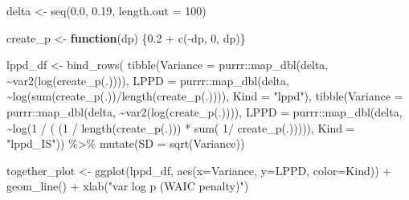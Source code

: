 \documentclass[
]{book}
\newenvironment{Shaded}{\begin{snugshade}}{\end{snugshade}}
\newcommand{\AttributeTok}[1]{\textcolor[rgb]{0.77,0.63,0.00}{#1}}
\newcommand{\ControlFlowTok}[1]{\textcolor[rgb]{0.13,0.29,0.53}{\textbf{#1}}}
\newcommand{\DecValTok}[1]{\textcolor[rgb]{0.00,0.00,0.81}{#1}}
\newcommand{\FloatTok}[1]{\textcolor[rgb]{0.00,0.00,0.81}{#1}}
\newcommand{\FunctionTok}[1]{\textcolor[rgb]{0.00,0.00,0.00}{#1}}
\newcommand{\NormalTok}[1]{#1}
\newcommand{\OtherTok}[1]{\textcolor[rgb]{0.56,0.35,0.01}{#1}}
\newcommand{\SpecialCharTok}[1]{\textcolor[rgb]{0.00,0.00,0.00}{#1}}
\newcommand{\StringTok}[1]{\textcolor[rgb]{0.31,0.60,0.02}{#1}}
\begin{document}
\begin{Shaded}
\begin{Highlighting}[]
\NormalTok{delta }\OtherTok{\textless{}{-}} \FunctionTok{seq}\NormalTok{(}\FloatTok{0.0}\NormalTok{, }\FloatTok{0.19}\NormalTok{, }\AttributeTok{length.out =} \DecValTok{100}\NormalTok{)}

\NormalTok{create\_p }\OtherTok{\textless{}{-}} \ControlFlowTok{function}\NormalTok{(dp) \{}\FloatTok{0.2} \SpecialCharTok{+} \FunctionTok{c}\NormalTok{(}\SpecialCharTok{{-}}\NormalTok{dp, }\DecValTok{0}\NormalTok{, dp)\}}

\NormalTok{lppd\_df }\OtherTok{\textless{}{-}} \FunctionTok{bind\_rows}\NormalTok{(}
  \FunctionTok{tibble}\NormalTok{(}\AttributeTok{Variance =}\NormalTok{ purrr}\SpecialCharTok{::}\FunctionTok{map\_dbl}\NormalTok{(delta, }\SpecialCharTok{\textasciitilde{}}\FunctionTok{var2}\NormalTok{(}\FunctionTok{log}\NormalTok{(}\FunctionTok{create\_p}\NormalTok{(.)))),}
         \AttributeTok{LPPD =}\NormalTok{ purrr}\SpecialCharTok{::}\FunctionTok{map\_dbl}\NormalTok{(delta, }\SpecialCharTok{\textasciitilde{}}\FunctionTok{log}\NormalTok{(}\FunctionTok{sum}\NormalTok{(}\FunctionTok{create\_p}\NormalTok{(.))}\SpecialCharTok{/}\FunctionTok{length}\NormalTok{(}\FunctionTok{create\_p}\NormalTok{(.)))),}
         \AttributeTok{Kind =} \StringTok{"lppd"}\NormalTok{),}
  \FunctionTok{tibble}\NormalTok{(}\AttributeTok{Variance =}\NormalTok{ purrr}\SpecialCharTok{::}\FunctionTok{map\_dbl}\NormalTok{(delta, }\SpecialCharTok{\textasciitilde{}}\FunctionTok{var2}\NormalTok{(}\FunctionTok{log}\NormalTok{(}\FunctionTok{create\_p}\NormalTok{(.)))),}
       \AttributeTok{LPPD =}\NormalTok{ purrr}\SpecialCharTok{::}\FunctionTok{map\_dbl}\NormalTok{(delta, }\SpecialCharTok{\textasciitilde{}}\FunctionTok{log}\NormalTok{(}\DecValTok{1} \SpecialCharTok{/}\NormalTok{ ( (}\DecValTok{1} \SpecialCharTok{/} \FunctionTok{length}\NormalTok{(}\FunctionTok{create\_p}\NormalTok{(.))) }\SpecialCharTok{*} \FunctionTok{sum}\NormalTok{( }\DecValTok{1}\SpecialCharTok{/} \FunctionTok{create\_p}\NormalTok{(.))))),}
       \AttributeTok{Kind =} \StringTok{"lppd\_IS"}\NormalTok{)) }\SpecialCharTok{\%\textgreater{}\%}
  \FunctionTok{mutate}\NormalTok{(}\AttributeTok{SD =} \FunctionTok{sqrt}\NormalTok{(Variance))}

\NormalTok{together\_plot }\OtherTok{\textless{}{-}} 
  \FunctionTok{ggplot}\NormalTok{(lppd\_df, }\FunctionTok{aes}\NormalTok{(}\AttributeTok{x=}\NormalTok{Variance, }\AttributeTok{y=}\NormalTok{LPPD, }\AttributeTok{color=}\NormalTok{Kind)) }\SpecialCharTok{+} 
  \FunctionTok{geom\_line}\NormalTok{() }\SpecialCharTok{+} 
  \FunctionTok{xlab}\NormalTok{(}\StringTok{"var log p (WAIC penalty)"}\NormalTok{)}


\end{Highlighting}
\end{Shaded}
\end{document}
